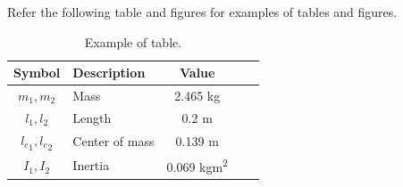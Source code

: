 \documentclass[lettersize,journal]{IEEEtran}
\begin{document}
Refer the following table and figures for examples of tables and figures.

\begin{table}[t]
    \renewcommand{\arraystretch}{1.3}
    \caption{Example of table.}
    \centering
    \begin{tabular}{c m{9.5em} c c c }
    \hline
    \textbf{Symbol} & \textbf{Description} & \textbf{Value} \\
    \hline
    \hline 
    $m_1,m_2$ & Mass & 2.465 kg \\
    \hline
    $l_1,l_2$  & Length & 0.2 m \\  
    \hline
    ${l_c}_1,{l_c}_2$ & Center of mass & 0.139 m \\
    \hline
    $I_1,I_2$  & Inertia & 0.069 kgm\textsuperscript{2} \\
    \hline
    \end{tabular}
    \label{table:example}
\end{table}
\end{document}
